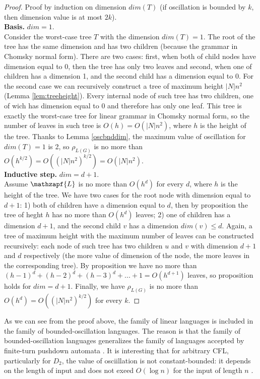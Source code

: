 \begin{proof}
Proof by induction on dimension $dim(T)$ (if oscillation is bounded by $k$, then dimension value is at most $2k$).
\\
\textbf{Basis.} $dim = 1$.
\\
Consider the worst-case tree $T$ with the dimension $dim(T) = 1$. The root of the tree has the same dimension and has two children (because the grammar in Chomsky normal form). There are two cases:  first, when both of child nodes have dimension equal to 0, then the tree has only two leaves and second, when one of children has a dimension 1, and the second child has a dimension equal to 0. For the second case we can recursively construct a tree of maximum height $|N|n^2$ (Lemma \ref{lem:treeheight}). Every internal node of such tree has two children, one of wich has dimension equal to 0 and therefore has only one leaf. This tree is exactly the worst-case tree for linear grammar in Chomsky normal form, so the number of leaves in such tree is $O(h) = O(|N|n^2)$, where $h$ is the height of the tree. Thanks to Lemma \ref{oscbnddim}, the maximum value of oscillation for $dim(T) = 1$ is 2, so $\rho_{L(G)}$ is no more than $O(h^{k/2}) = O((|N|n^2)^{k/2}) = O(|N|n^2)$.
\\
\textbf{Inductive step.} $dim = d + 1$.
\\
Assume $\mathzapf{L}$ is no more than $O(h^{d})$ for every $d$, where $h$ is the height of the tree. We have two cases for the root node with dimension equal to $d+1$: 1) both of children have a dimension equal to $d$, then by proposition the tree of heght $h$ has no more than $O(h^{d})$ leaves; 2) one of children has a dimension $d + 1$, and the second child $v$ has a dimension $dim(v) \le d$. Again, a tree of maximum height with the maximum number of leaves can be constructed recursively:  each node of such tree has two children $u$ and $v$ with dimension $d+1$ and $d$ respectively (the more value of dimension of the node, the more leaves in the corresponding tree). By proposition we have no more than $(h-1)^d + (h-2)^d + (h-3)^d + ... + 1 = O(h^{d+1})$ leaves, so proposition holds for $dim = d+1$. Finally, we have $\rho_{L(G)}$ is no more than $O(h^{d}) = O((|N|n^2)^{k/2})$ for every $k$.
\end{proof}


As we can see from the proof above, the family of linear languages is included in the family of bounded-oscillation languages. The reason is that the family of bounded-oscillation languages generalizes the family of languages accepted by finite-turn pushdown automata \cite{BoundOsc}. It is interesting that for arbitrary CFL, particularly for $D_2$, the value of osciillation is not constant-bounded: it depends on the length of input and does not exeed $O(\log n)$ for the input of length $n$ \cite*{Gundermann, Wechsung}.

